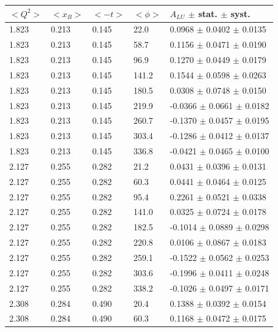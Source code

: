 \begin{table}[!h]
   \begin{center}
      \begin{tabular}{||l|l|l|l|l||}
         \hline
 $<Q^{2}>$ & $<x_{B}>$ & $<-t>$ & $<\phi>$ & $A_{LU}$ $\pm$ stat. $\pm$ syst.\\
  \hline

   1.823 & 0.213 & 0.145 & 22.0  &  0.0968 $\pm$ 0.0402 $\pm$ 0.0135 \\
   1.823 & 0.213 & 0.145 & 58.7  &  0.1156 $\pm$ 0.0471 $\pm$ 0.0190 \\
   1.823 & 0.213 & 0.145 & 96.9  &  0.1270 $\pm$ 0.0449 $\pm$ 0.0179 \\
   1.823 & 0.213 & 0.145 & 141.2 &  0.1544 $\pm$ 0.0598 $\pm$ 0.0263 \\
   1.823 & 0.213 & 0.145 & 180.5 &  0.0308 $\pm$ 0.0748 $\pm$ 0.0150 \\
   1.823 & 0.213 & 0.145 & 219.9 & -0.0366 $\pm$ 0.0661 $\pm$ 0.0182 \\
   1.823 & 0.213 & 0.145 & 260.7 & -0.1370 $\pm$ 0.0457 $\pm$ 0.0195 \\
   1.823 & 0.213 & 0.145 & 303.4 & -0.1286 $\pm$ 0.0412 $\pm$ 0.0137 \\
   1.823 & 0.213 & 0.145 & 336.8 & -0.0421 $\pm$ 0.0465 $\pm$ 0.0100 \\
 \hline                                    
  2.127 & 0.255 & 0.282  & 21.2  &  0.0431 $\pm$ 0.0396 $\pm$ 0.0131 \\
  2.127 & 0.255 & 0.282  & 60.3  &  0.0441 $\pm$ 0.0464 $\pm$ 0.0125 \\
  2.127 & 0.255 & 0.282  & 95.4  &  0.2261 $\pm$ 0.0521 $\pm$ 0.0338 \\
  2.127 & 0.255 & 0.282  & 141.0 &  0.0325 $\pm$ 0.0724 $\pm$ 0.0178 \\
  2.127 & 0.255 & 0.282  & 182.5 & -0.1014 $\pm$ 0.0889 $\pm$ 0.0298 \\
  2.127 & 0.255 & 0.282  & 220.8 &  0.0106 $\pm$ 0.0867 $\pm$ 0.0183 \\
  2.127 & 0.255 & 0.282  & 259.1 & -0.1522 $\pm$ 0.0562 $\pm$ 0.0253 \\
  2.127 & 0.255 & 0.282  & 303.6 & -0.1996 $\pm$ 0.0411 $\pm$ 0.0248 \\
  2.127 & 0.255 & 0.282  & 338.2 & -0.1026 $\pm$ 0.0497 $\pm$ 0.0171 \\
 \hline                                   
  2.308 & 0.284 & 0.490  & 20.4  &  0.1388 $\pm$ 0.0392 $\pm$ 0.0154 \\
  2.308 & 0.284 & 0.490  & 60.3  &  0.1168 $\pm$ 0.0472 $\pm$ 0.0175 \\

\end{tabular}
\end{center}
\end{table}
